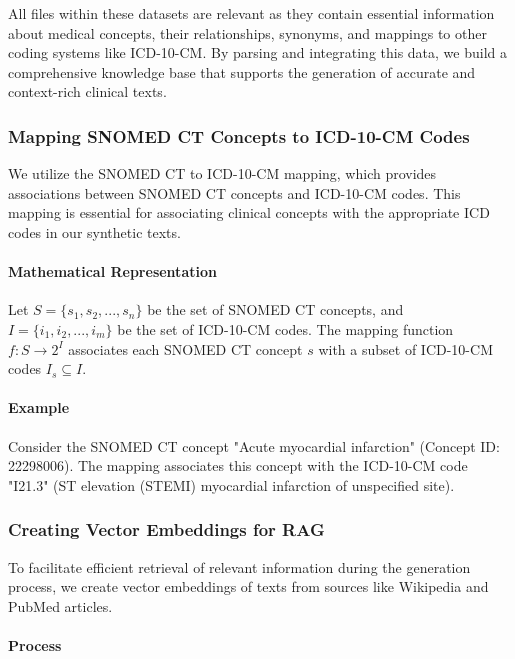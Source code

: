 \documentclass[12pt, a4paper]{article}
\begin{document}
All files within these datasets are relevant as they contain essential information about medical concepts, their relationships, synonyms, and mappings to other coding systems like ICD-10-CM. By parsing and integrating this data, we build a comprehensive knowledge base that supports the generation of accurate and context-rich clinical texts.

\subsubsection{Mapping SNOMED CT Concepts to ICD-10-CM Codes}

We utilize the SNOMED CT to ICD-10-CM mapping, which provides associations between SNOMED CT concepts and ICD-10-CM codes. This mapping is essential for associating clinical concepts with the appropriate ICD codes in our synthetic texts.

\paragraph{Mathematical Representation}

Let \( S = \{s_1, s_2, ..., s_n\} \) be the set of SNOMED CT concepts, and \( I = \{i_1, i_2, ..., i_m\} \) be the set of ICD-10-CM codes. The mapping function \( f: S \rightarrow 2^I \) associates each SNOMED CT concept \( s \) with a subset of ICD-10-CM codes \( I_s \subseteq I \).

\paragraph{Example}

Consider the SNOMED CT concept "Acute myocardial infarction" (Concept ID: 22298006). The mapping associates this concept with the ICD-10-CM code "I21.3" (ST elevation (STEMI) myocardial infarction of unspecified site).

\subsubsection{Creating Vector Embeddings for RAG}

To facilitate efficient retrieval of relevant information during the generation process, we create vector embeddings of texts from sources like Wikipedia and PubMed articles.

\paragraph{Process}
\end{document}
